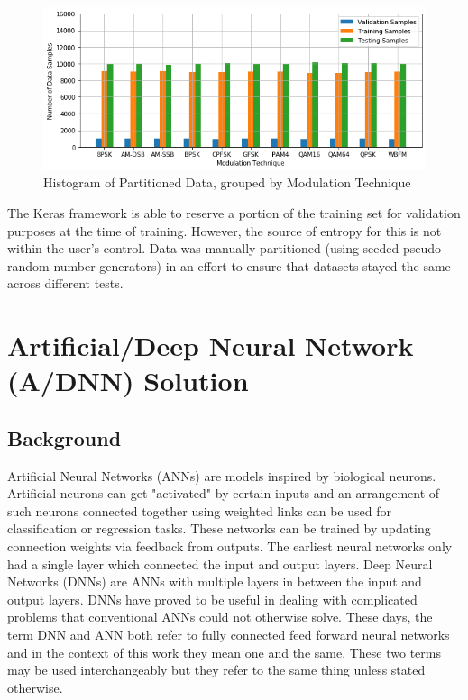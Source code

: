 \documentclass[journal,onecolumn]{IEEEtran}
\begin{document}
\begin{figure}[h]
	\centering
	\includegraphics[scale=0.6]{stratSampleModTech}
	\caption{Histogram of Partitioned Data, grouped by Modulation Technique}
	\label{strat-sample}
\end{figure}

The Keras framework is able to reserve a portion of the training set for validation purposes at the time of training. However, the source of entropy for this is not within the user's control. Data was manually partitioned (using seeded pseudo-random number generators) in an effort to ensure that datasets stayed the same across different tests.

\section{Artificial/Deep Neural Network (A/DNN) Solution}

\subsection{Background}

Artificial Neural Networks (ANNs) are models inspired by biological neurons. Artificial neurons can get "activated" by certain inputs and an arrangement of such neurons connected together using weighted links can be used for classification or regression tasks. These networks can be trained by updating connection weights via feedback from outputs. The earliest neural networks only had a single layer which connected the input and output layers. Deep Neural Networks (DNNs) are ANNs with multiple layers in between the input and output layers. DNNs have proved to be useful in dealing with complicated problems that conventional ANNs could not otherwise solve. These days, the term DNN and ANN both refer to fully connected feed forward neural networks and in the context of this work they mean one and the same. These two terms may be used interchangeably but they refer to the same thing unless stated otherwise.
\end{document}
